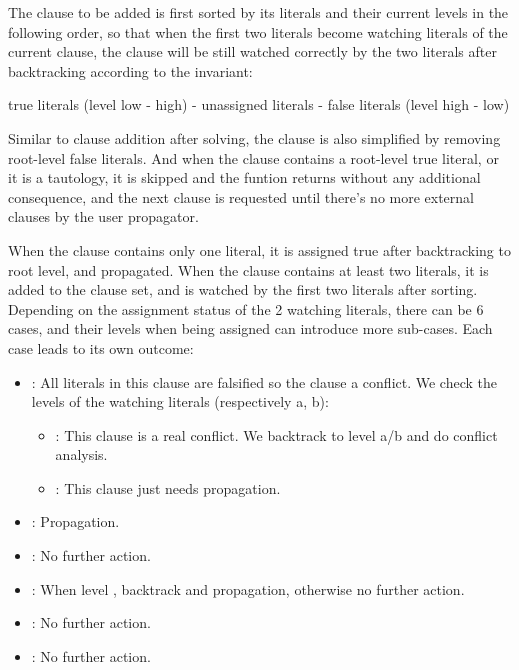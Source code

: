 
The clause to be added is first sorted by its literals and their current levels in the following order, so that when the first two literals become watching literals of the current clause, the clause will be still watched correctly by the two literals after backtracking according to the invariant:

true literals (level low - high) - unassigned literals - false literals (level high - low)

Similar to clause addition after solving, the clause is also simplified by removing root-level false literals. And when the clause contains a root-level true literal, or it is a tautology, it is skipped and the funtion returns without any additional consequence, and the next clause is requested until there's no more external clauses by the user propagator.

When the clause contains only one literal, it is assigned true after backtracking to root level, and propagated. When the clause contains at least two literals, it is added to the clause set, and is watched by the first two literals after sorting. Depending on the assignment status of the 2 watching literals, there can be 6 cases, and their levels when being assigned can introduce more sub-cases. Each case leads to its own outcome:

\begin{itemize}
  \item {}: All literals in this clause are falsified so the clause a conflict. We check the levels of the watching literals (respectively a, b):
  \begin{itemize}
    \item {}: This clause is a real conflict. We backtrack to level a/b and do conflict analysis.
    \item {}: This clause just needs propagation.
  \end{itemize}
  \item {}: Propagation.
  \item {}: No further action.
  \item {}: When level , backtrack and propagation, otherwise no further action.
  \item {}: No further action.
  \item {}: No further action.
\end{itemize}

